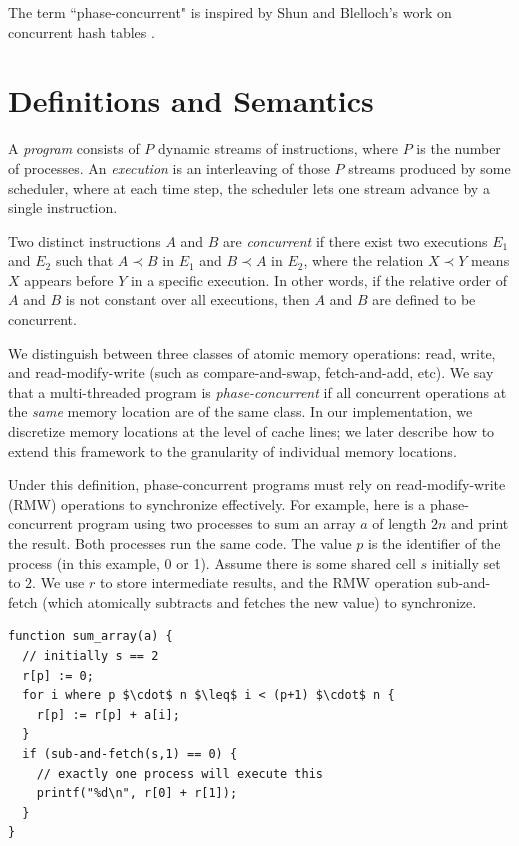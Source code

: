 \documentclass{article}
\begin{document}
The term ``phase-concurrent" is inspired by Shun and Blelloch's work on concurrent hash tables \cite{shun2014phase}.

\section{Definitions and Semantics}

A \textit{program} consists of $P$ dynamic streams of instructions, where $P$ is the number of processes. An \textit{execution} is an interleaving of those $P$ streams produced by some scheduler, where at each time step, the scheduler lets one stream advance by a single instruction.

Two distinct instructions $A$ and $B$ are \textit{concurrent} if there exist two executions $E_1$ and $E_2$ such that $A \prec B$ in $E_1$ and $B \prec A$ in $E_2$, where the relation $X \prec Y$ means $X$ appears before $Y$ in a specific execution. In other words, if the relative order of $A$ and $B$ is not constant over all executions, then $A$ and $B$ are defined to be concurrent.

We distinguish between three classes of atomic memory operations: read, write, and read-modify-write (such as compare-and-swap, fetch-and-add, etc). We say that a multi-threaded program is \textit{phase-concurrent} if all concurrent operations at the \textit{same} memory location are of the same class. In our implementation, we discretize memory locations at the level of cache lines; we later describe how to extend this framework to the granularity of individual memory locations.

Under this definition, phase-concurrent programs must rely on read-modify-write (RMW) operations to synchronize effectively. For example, here is a phase-concurrent program using two processes to sum an array $a$ of length $2n$ and print the result. Both processes run the same code. The value $p$ is the identifier of the process (in this example, 0 or 1). Assume there is some shared cell $s$ initially set to $2$. We use $r$ to store intermediate results, and the RMW operation sub-and-fetch (which atomically subtracts and fetches the new value) to synchronize.

\begin{lstlisting}
function sum_array(a) {
  // initially s == 2
  r[p] := 0;
  for i where p $\cdot$ n $\leq$ i < (p+1) $\cdot$ n {
    r[p] := r[p] + a[i];
  }
  if (sub-and-fetch(s,1) == 0) {
    // exactly one process will execute this
    printf("%d\n", r[0] + r[1]);
  }
}
\end{lstlisting}
\end{document}
